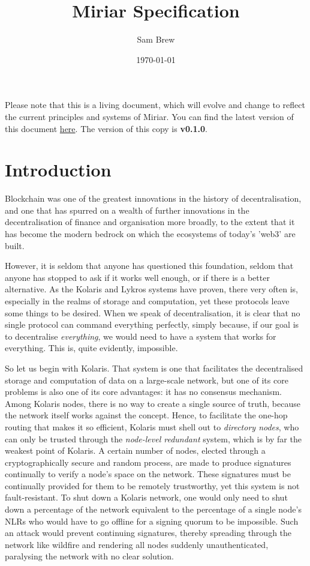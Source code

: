 \documentclass{extreport}
\author{Sam Brew}
\date{\today}
\title{Miriar Specification}
\begin{document}
\maketitle
\tableofcontents
\vspace*{\fill}
\noindent Please note that this is a living document, which will evolve and change to reflect the current principles and systems of Miriar. You can find the latest version of this document \href{https://github.com/TheQuantorium/miriar/releases}{here}. The version of this copy is \textbf{v0.1.0}.
\doclicenseThis


\part{Introduction}
\label{sec:org14ec0e7}

Blockchain was one of the greatest innovations in the history of decentralisation, and one that has spurred on a wealth of further innovations in the decentralisation of finance and organisation more broadly, to the extent that it has become the modern bedrock on which the ecosystems of today's 'web3' are built.

However, it is seldom that anyone has questioned this foundation, seldom that anyone has stopped to ask if it works well enough, or if there is a better alternative. As the Kolaris and Lykros systems have proven, there very often is, especially in the realms of storage and computation, yet these protocols leave some things to be desired. When we speak of decentralisation, it is clear that no single protocol can command everything perfectly, simply because, if our goal is to decentralise \emph{everything}, we would need to have a system that works for everything. This is, quite evidently, impossible.

So let us begin with Kolaris. That system is one that facilitates the decentralised storage and computation of data on a large-scale network, but one of its core problems is also one of its core advantages: it has no consensus mechanism. Among Kolaris nodes, there is no way to create a single source of truth, because the network itself works against the concept. Hence, to facilitate the one-hop routing that makes it so efficient, Kolaris must shell out to \emph{directory nodes}, who can only be trusted through the \emph{node-level redundant} system, which is by far the weakest point of Kolaris. A certain number of nodes, elected through a cryptographically secure and random process, are made to produce signatures continually to verify a node's space on the network. These signatures must be continually provided for them to be remotely trustworthy, yet this system is not fault-resistant. To shut down a Kolaris network, one would only need to shut down a percentage of the network equivalent to the percentage of a single node's NLRs who would have to go offline for a signing quorum to be impossible. Such an attack would prevent continuing signatures, thereby spreading through the network like wildfire and rendering all nodes suddenly unauthenticated, paralysing the network with no clear solution.
\end{document}
